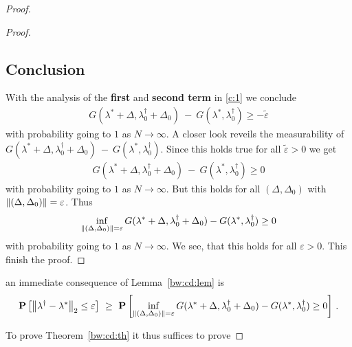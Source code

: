 \begin{proof}
\begin{proof}
\subsection*{Conclusion}
With the analysis of the \textbf{first} and \textbf{second term} in
\eqref{c:1} we conclude
\begin{gather}
  G
     (
     \lambda^*
      +
      \Delta
      ,
      \lambda^\dagger_0
      +
     \Delta_0
     )
     \ 
     -
     \ 
     G
     (
     \lambda^*,
      \lambda^\dagger_0
     )
     \ge
     -
     \tilde{\varepsilon}
\end{gather}
with probability going to $1$ as $N\to \infty$.
A closer look reveils the measurability of 
$
  G
     (
     \lambda^*
      +
      \Delta
      ,
      \lambda^\dagger_0
      +
     \Delta_0
     )
     \ 
     -
     \ 
     G
     (
     \lambda^*,
      \lambda^\dagger_0
     )
$.
Since this holds true for all $\tilde{\varepsilon}>0$ we get
\begin{gather}
  G
     (
     \lambda^*
      +
      \Delta
      ,
      \lambda^\dagger_0
      +
     \Delta_0
     )
     \ 
     -
     \ 
     G
     (
     \lambda^*,
      \lambda^\dagger_0
     )
     \ge
     0
\end{gather}
with probability going to $1$ as $N\to \infty$.
But this holds for all 
$
(\Delta,\Delta_0)
$
with 
$
\left\lVert
(\Delta,\Delta_0)
\right\rVert
=\varepsilon
$. Thus
\begin{gather}
   \inf _ { 
       \left\lVert
         (
     \Delta
     ,
     \Delta_0
         )
 \right\rVert 
= \varepsilon }
     G
     (
     \lambda^*
      +
      \Delta
      ,
      \lambda^\dagger_0
      +
     \Delta_0
     )
     -
     G
     (
     \lambda^*,
      \lambda^\dagger_0
     )
     \ge 
     0
\end{gather}
with probability going to $1$ as $N\to \infty$.
We see, that this holds for all $\varepsilon>0$. This finish the proof.
 \end{proof}


an immediate consequence of Lemma~\ref{bw:cd:lem} is
\begin{gather*}
   \P
   \left[ 
     \norm
     {
      \lambda ^ \dagger
      -
      \lambda^*
     }_2
     \le
     \varepsilon
   \right]
   \
   \ge
   \ 
   \P
   \left[ 
     \inf _ { 
       \norm{
         (
     \Delta
     ,
     \Delta_0
         )
 } 
= \varepsilon }
     G
     (
     \lambda^*
      +
      \Delta
      ,
      \lambda^\dagger_0
      +
     \Delta_0
     )
     -
     G
     (
     \lambda^*,
      \lambda^\dagger_0
     )
     \ge 
     0
   \right]
   \,.
 \end{gather*}

 To prove Theorem~\ref{bw:cd:th}
 it thus suffices to prove
\end{proof}

